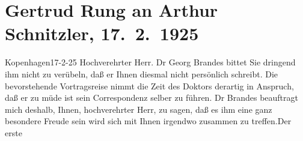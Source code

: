 

         
         \renewcommand{\erwaehntePersonen}{Personen: Georg Brandes, Alfons Fedor Cohn, J.  Span}
         \renewcommand{\erwaehnteOrte}{Orte: Berlin, Blüthner-Saal, Kopenhagen, Straße des 17. Juni, Wien}
         \renewcommand{\erwaehnteWerke}{Werke: Berliner Tageblatt, Das heutige Europa, Georg Brandes in Berlin}
               \section[Gertrud Rung an Arthur Schnitzler, 17. 2. 1925]{ Gertrud Rung an Arthur Schnitzler, 17. 2. 1925}\nopagebreak{}\rehead{ }\begin{ledgroupsized}[t]{13cm}\normalsize\beginnumbering \toendnotes[C]{\smallbreak\pagebreak[2]} 
\toendnotes[C]{\smallbreak}\pstart
           \raggedleft{}{\pb}Kopenhagen17-2-25\pend
           \pstart{}Hochverehrter Herr.\pend\pstart
           Dr Georg Brandes bittet Sie dringend ihm nicht
               zu verübeln, daß er Ihnen diesmal nicht persönlich schreibt. Die bevorstehende
               Vortragsreise nimmt die Zeit des Doktors derartig in Anspruch, daß er zu müde ist
               sein Correspondenz selber zu führen.\pend
           \pstart
           Dr Brandes beauftragt mich deshalb, Ihnen,
               hochverehrter Herr, zu sagen, daß es ihm eine ganz besondere Freude sein wird sich
               mit Ihnen irgendwo zusammen zu treffen.\hspace*{1.5em}Der erste

\end{ledgroupsized}
